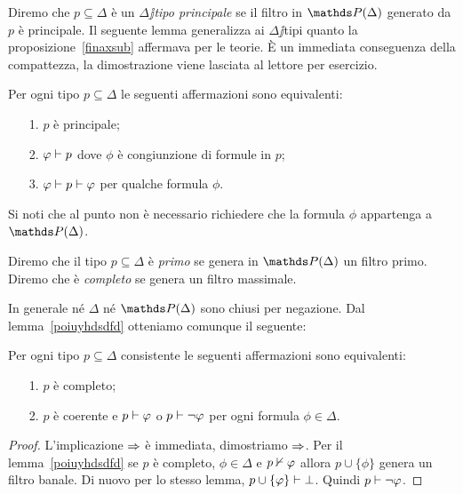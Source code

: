 Diremo che $p\subseteq\Delta$ \`e un \emph{$\Delta\jj$tipo principale\/} se il filtro in $\PP(\Delta)$ generato da $p$ \`e principale. Il seguente lemma generalizza ai $\Delta\jj$tipi quanto la proposizione~\ref{finaxsub} affermava per le teorie. \`E un immediata conseguenza della compattezza, la dimostrazione viene lasciata al lettore per esercizio.

\begin{lemma}
Per ogni tipo $p\subseteq\Delta$ le seguenti affermazioni sono equivalenti:
\begin{itemize}
\item[1.] $p$ \`e principale;
\item[2.] $\varphi\vdash p$ dove $\phi$ \`e congiunzione di formule in $p$;
\item[3.] $\varphi\vdash p\vdash \varphi$ per qualche formula $\phi$.\QED 
\end{itemize}
\end{lemma}

Si noti che al punto  non \`e necessario richiedere che la formula $\phi$ appartenga a $\PP(\Delta)$. 

\begin{definition}
Diremo che il tipo $p\subseteq\Delta$ \`e \emph{primo\/} se genera in $\PP(\Delta)$ un filtro primo. Diremo che \`e \emph{completo\/} se genera un filtro massimale. \end{definition}

In generale n\'e $\Delta$ n\'e $\PP(\Delta)$ sono chiusi per negazione. Dal lemma~\ref{poiuyhdsdfd} otteniamo comunque il seguente: 

\begin{corollary}\label{coroll_test_primalita}
Per ogni tipo $p\subseteq\Delta$ consistente le seguenti affermazioni sono equivalenti:
\begin{itemize}
\item[1.] $p$ \`e completo;
\item[2.] $p$ \`e coerente e $p\vdash\varphi$ o $p\vdash\neg\varphi$ per ogni formula $\phi\in\Delta$.
\end{itemize}
\end{corollary}
\begin{proof}
L'implicazione $\Rightarrow$ \`e immediata, dimostriamo $\Rightarrow$. Per il lemma~\ref{poiuyhdsdfd} se $p$ \`e completo, $\phi\in\Delta$ e $p\nvdash\varphi$ allora $p\cup\{\phi\}$ genera un filtro banale. Di nuovo per lo stesso lemma, $p\cup\{\varphi\}\vdash\bot$. Quindi $p\vdash\neg\varphi$. 
\end{proof}

